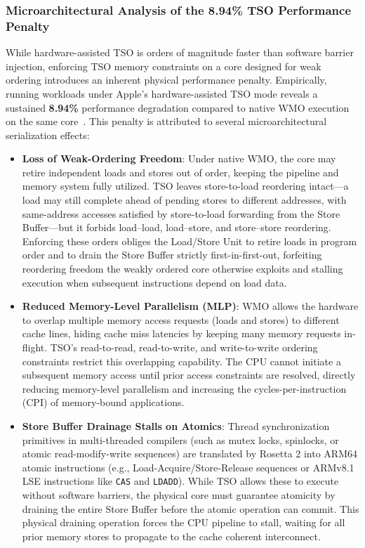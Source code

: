\subsubsection{Microarchitectural Analysis of the 8.94\% TSO Performance Penalty}
While hardware-assisted TSO is orders of magnitude faster than software barrier injection, enforcing TSO memory constraints on a core designed for weak ordering introduces an inherent physical performance penalty. Empirically, running workloads under Apple's hardware-assisted TSO mode reveals a sustained \textbf{8.94\%} performance degradation compared to native WMO execution on the same core~\cite{Wrenger2024AppleM1}. This penalty is attributed to several microarchitectural serialization effects:
\begin{itemize}
    \item \textbf{Loss of Weak-Ordering Freedom}: Under native WMO, the core may retire independent loads and stores out of order, keeping the pipeline and memory system fully utilized. TSO leaves store-to-load reordering intact---a load may still complete ahead of pending stores to different addresses, with same-address accesses satisfied by store-to-load forwarding from the Store Buffer---but it forbids load--load, load--store, and store--store reordering. Enforcing these orders obliges the Load/Store Unit to retire loads in program order and to drain the Store Buffer strictly first-in-first-out, forfeiting reordering freedom the weakly ordered core otherwise exploits and stalling execution when subsequent instructions depend on load data.
    \item \textbf{Reduced Memory-Level Parallelism (MLP)}: WMO allows the hardware to overlap multiple memory access requests (loads and stores) to different cache lines, hiding cache miss latencies by keeping many memory requests in-flight. TSO's read-to-read, read-to-write, and write-to-write ordering constraints restrict this overlapping capability. The CPU cannot initiate a subsequent memory access until prior access constraints are resolved, directly reducing memory-level parallelism and increasing the cycles-per-instruction (CPI) of memory-bound applications.
    \item \textbf{Store Buffer Drainage Stalls on Atomics}: Thread synchronization primitives in multi-threaded compilers (such as mutex locks, spinlocks, or atomic read-modify-write sequences) are translated by Rosetta 2 into ARM64 atomic instructions (e.g., Load-Acquire/Store-Release sequences or ARMv8.1 LSE instructions like \texttt{CAS} and \texttt{LDADD}). While TSO allows these to execute without software barriers, the physical core must guarantee atomicity by draining the entire Store Buffer before the atomic operation can commit. This physical draining operation forces the CPU pipeline to stall, waiting for all prior memory stores to propagate to the cache coherent interconnect.

\end{itemize}
